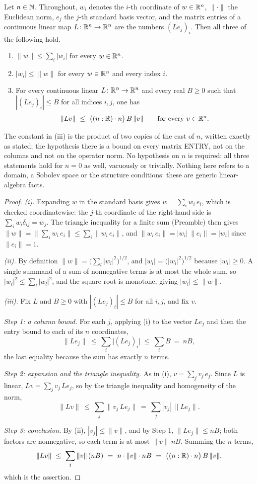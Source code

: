 \begin{helper}
Let $n\in\mathbb{N}$.  Throughout, $w_i$ denotes the $i$-th coordinate of
$w\in\mathbb{R}^n$, $\|\cdot\|$ the Euclidean norm, $e_j$ the $j$-th standard basis
vector, and the matrix entries of a continuous linear map
$L\colon\mathbb{R}^n\to\mathbb{R}^n$ are the numbers $(Le_j)_i$.  Then all three of the
following hold.
\begin{enumerate}
\item[(i)] $\|w\|\le\sum_i|w_i|$ for every $w\in\mathbb{R}^n$.
\item[(ii)] $|w_i|\le\|w\|$ for every $w\in\mathbb{R}^n$ and every index $i$.
\item[(iii)] For every continuous linear $L\colon\mathbb{R}^n\to\mathbb{R}^n$ and every real
  $B\ge0$ such that $|(Le_j)_i|\le B$ for all indices $i,j$, one has
  \[
  \|Lv\|\ \le\ \bigl((n:\mathbb{R})\cdot n\bigr)\,B\,\|v\|
  \qquad\text{for every }v\in\mathbb{R}^n .
  \]
\end{enumerate}
The constant in (iii) is the product of two copies of the cast of $n$, written
exactly as stated; the hypothesis there is a bound on every matrix ENTRY, not
on the columns and not on the operator norm.  No hypothesis on $n$ is required:
all three statements hold for $n=0$ as well, vacuously or trivially.  Nothing
here refers to a domain, a Sobolev space or the structure conditions: these are
generic linear-algebra facts.
\end{helper}
\begin{proof}
\emph{(i).}  Expanding $w$ in the standard basis gives
$w=\sum_i w_i\,e_i$, which is checked coordinatewise: the $j$-th coordinate of
the right-hand side is $\sum_iw_i\delta_{ij}=w_j$.  The triangle inequality for
a finite sum (Preamble) then gives
$\|w\|=\bigl\|\sum_iw_i\,e_i\bigr\|\le\sum_i\|w_i\,e_i\|$, and
$\|w_i\,e_i\|=|w_i|\,\|e_i\|=|w_i|$ since $\|e_i\|=1$.

\emph{(ii).}  By definition $\|w\|=\bigl(\sum_l|w_l|^2\bigr)^{1/2}$, and
$|w_i|=\bigl(|w_i|^2\bigr)^{1/2}$ because $|w_i|\ge0$.  A single summand of a
sum of nonnegative terms is at most the whole sum, so
$|w_i|^2\le\sum_l|w_l|^2$, and the square root is monotone, giving
$|w_i|\le\|w\|$.

\emph{(iii).}  Fix $L$ and $B\ge0$ with $|(Le_j)_i|\le B$ for all $i,j$, and fix
$v$.

\emph{Step 1: a column bound.}  For each $j$, applying (i) to the vector
$Le_j$ and then the entry bound to each of its $n$ coordinates,
\[
\|Le_j\|\ \le\ \sum_i\bigl|(Le_j)_i\bigr|\ \le\ \sum_{i}B\ =\ nB,
\]
the last equality because the sum has exactly $n$ terms.

\emph{Step 2: expansion and the triangle inequality.}  As in (i),
$v=\sum_jv_j\,e_j$.  Since $L$ is linear, $Lv=\sum_jv_j\,Le_j$, so by the
triangle inequality and homogeneity of the norm,
\[
\|Lv\|\ \le\ \sum_j\bigl\|v_j\,Le_j\bigr\|\ =\ \sum_j|v_j|\,\|Le_j\| .
\]

\emph{Step 3: conclusion.}  By (ii), $|v_j|\le\|v\|$, and by Step 1,
$\|Le_j\|\le nB$; both factors are nonnegative, so each term is at most
$\|v\|\,nB$.  Summing the $n$ terms,
\[
\|Lv\|\ \le\ \sum_{j}\|v\|\,(nB)\ =\ n\cdot\|v\|\cdot nB
\ =\ \bigl((n:\R)\cdot n\bigr)\,B\,\|v\| ,
\]
which is the assertion.
\end{proof}
